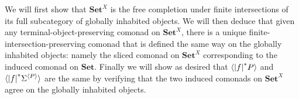 \documentclass[11pt, oneside, article]{memoir}
\theoremstyle{plain}
\theoremstyle{definition}
\theoremstyle{remark}
\DeclarePairedDelimiter{\gen}{\langle}{\rangle}
\DeclarePairedDelimiter{\abs}{\lvert}{\rvert}
\newcommand{\namedcat}[1]{\mathbf{#1}}
\newcommand{\cat}[1]{\mathbf{#1}}
\newcommand{\Set}{\namedcat{Set}}
\newcommand{\clift}[1]{\overline{#1}}
\newcommand{\pts}[1]{{\abs{#1}}}
\newcommand{\one}[1]{\pts{#1}}
\newcommand{\ptlift}[1]{\overline{#1}}
\newcommand{\carr}{\Sigma}
\newcommand{\reindex}[1]{\Delta_{#1}}
\newcommand{\car}[1]{\carr^{#1}}
\newcommand{\carP}{\car{\cP}}
\newcommand{\ph}[1]{#1}
\newcommand{\cmnd}[1]{{#1}}
\newcommand{\xX}{X}
\newcommand{\cC}{\cmnd{C}}
\newcommand{\bB}{\cat{B}}
\newcommand{\pP}{\ph{P}}
\newcommand{\cP}{\gen{\pP}}
\newcommand{\SetC}{\Set/\pts{\cC}}
\newcommand{\SetP}{\Set/\pts{\pP}}
\begin{document}
We will first show that $\Set^\xX$ is the free completion under finite
intersections of its full subcategory of globally inhabited
objects. We will then deduce that given any terminal-object-preserving
comonad on $\Set^\xX$, there is a unique
finite-intersection-preserving comonad that is defined the same way on
the globally inhabited objects: namely the sliced comonad on
$\Set^\xX$ corresponding to the induced comonad on $\Set$. Finally we
will show as desired that $\gen{\one{f}^* \pP}$ and
$\gen{\one{f}^* \carP}$ are the same by verifying that the two induced
comonads on $\Set^\xX$ agree on the globally inhabited objects.
\end{document}
